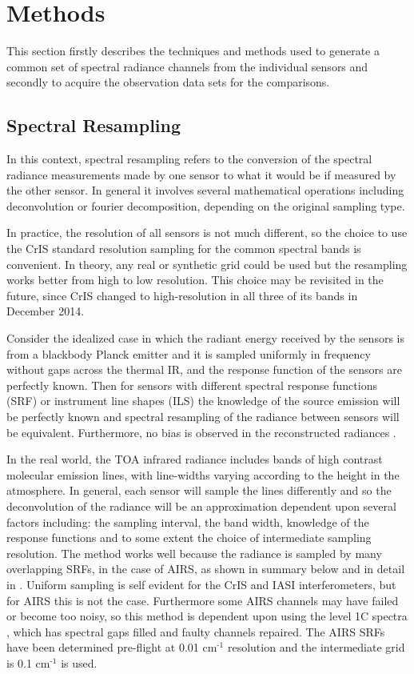 \documentclass[twocolumn,10pt]{article}
\begin{document}
\section{Methods}
\label{sec:orgheadline6}

This section firstly describes the techniques and methods used to generate a common set of spectral radiance channels from the individual sensors and secondly to acquire the observation data sets for the comparisons. 

\subsection{Spectral Resampling}
\label{sec:orgheadline4}

In this context, spectral resampling refers to the conversion of the spectral radiance measurements made by one sensor to what it would be if measured by the other sensor. In general it involves several mathematical operations including deconvolution or fourier decomposition, depending on the original sampling type.

In practice, the resolution of all sensors is not much different, so the choice to use the CrIS standard resolution sampling for the common spectral bands is convenient. In theory, any real or synthetic grid could be used but the resampling works better from high to low resolution. This choice may be revisited in the future, since CrIS changed to high-resolution in all three of its bands in December 2014.

Consider the idealized case in which the radiant energy received by the sensors is from a blackbody Planck emitter and it is sampled uniformly in frequency without gaps across the thermal IR, and the response function of the sensors are perfectly known. Then for sensors with different spectral response functions (SRF) or instrument line shapes (ILS) the knowledge of the source emission will be perfectly known and spectral resampling of the radiance between sensors will be equivalent. Furthermore, no bias is observed in the reconstructed radiances \cite{Motteler2017b}. 

In the real world, the TOA infrared radiance includes bands of high contrast molecular emission lines, with line-widths varying according to the height in the atmosphere. In general, each sensor will sample the lines differently and so the deconvolution of the radiance will be an approximation dependent upon several factors including: the sampling interval, the band width, knowledge of the response functions and to some extent the choice of intermediate sampling resolution. The method works well because the radiance is sampled by many overlapping SRFs, in the case of AIRS, as shown in summary below and in detail in \cite{Motteler2017a}. Uniform sampling is self evident for the CrIS and IASI interferometers, but for AIRS this is not the case. Furthermore some AIRS channels may have failed or become too noisy, so this method is dependent upon using the level 1C spectra \cite{Manning2015}, which has spectral gaps filled and faulty channels repaired. The AIRS SRFs have been determined pre-flight at 0.01 cm\(^{\text{-1}}\) resolution and the intermediate grid is 0.1 cm\(^{\text{-1}}\) is used.
\end{document}
